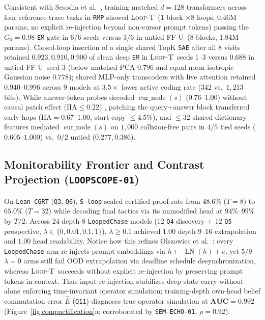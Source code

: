 \documentclass[10pt,letterpaper]{article}
\newcommand{\LoopT}{\textsc{Loop-T}}
\newcommand{\FFU}{\textsc{FF-U}}
\newcommand{\IIA}{\ensuremath{\mathrm{IIA}}}
\newcommand{\cur}{\operatorname{cur\_node}}
\begin{document}
Consistent with Sesodia et al.\ \cite{sesodia2026inside}, training matched $d=128$ transformers across four reference-trace tasks in \texttt{RMP} \cite{dugan2026rmp} showed \LoopT\ (1 block $\times 8$ loops, 0.46M params, no explicit re-injection beyond non-cursor prompt tokens) passing the $G_0 = 0.98$ \texttt{EM} gate in $6/6$ seeds versus $3/6$ in untied \FFU\ (8 blocks, 1.84M params). Closed-loop insertion of a single shared TopK \texttt{SAE} after all 8 visits retained $0.923, 0.910, 0.900$ of clean deep \texttt{EM} in \LoopT\ seeds 1--3 versus $0.688$ in untied \FFU\ seed 3 (below matched PCA $0.796$ and equal-norm isotropic Gaussian noise $0.778$); shared MLP-only transcoders \cite{dunefsky2024transcoders} with live attention retained $0.940$--$0.996$ across 9 models at $3.5\times$ lower active coding rate ($342$ vs.\ $1{,}213$ bits). While answer-token probes decoded $\cur(s)$ ($0.76$--$1.00$) without causal patch effect ($\IIA \le 0.22$) \cite{geiger2024das,makelov2024illusion}, patching the query+answer block transferred early hops ($\IIA = 0.67$--$1.00$, start-copy $\le 4.5\%$), and $\le 32$ shared-dictionary features mediated $\cur(s)$ on $1{,}000$ collision-free pairs in $4/5$ tied seeds ($0.605$--$1.000$) vs.\ $0/2$ untied ($0.277, 0.386$).

\subsection{Monitorability Frontier and Contrast Projection (\texttt{LOOPSCOPE-01})}

On \texttt{Lean-CGRT} (\texttt{Q3}, \texttt{Q6}), \texttt{S-loop} scaled certified proof rate from $48.6\%$ ($T=8$) to $65.0\%$ ($T=32$) while decoding final tactics via its unmodified head at $94\%$--$99\%$ by $T/2$. Across 24 depth-8 \texttt{LoopedChase} models ($12$ \texttt{Q4} discovery + $12$ \texttt{Q5} prospective, $\lambda \in \{0, 0.01, 0.1, 1\}$), $\lambda \ge 0.1$ achieved $1.00$ depth-9--16 extrapolation and $1.00$ head readability. Notice how this refines Olszowiec et al.\ \cite{olszowiec2026monitoring}: every \texttt{LoopedChase} arm re-injects prompt embeddings via $h \leftarrow \operatorname{LN}(h) + e$, yet $5/9$ $\lambda=0$ arms still fail OOD extrapolation via deadline schedule desynchronization, whereas \LoopT\ succeeds without explicit re-injection by preserving prompt tokens in context. Thus input re-injection stabilizes deep state carry without alone enforcing time-invariant operator simulation; training-depth own-head belief commutation error $\hat{E}$ (\texttt{Q11}) diagnoses true operator simulation at $\mathbf{AUC = 0.992}$ (Figure~\ref{fig:compactification}a; corroborated by \texttt{SEM-ECHO-01}, $\rho=0.92$).
\end{document}
